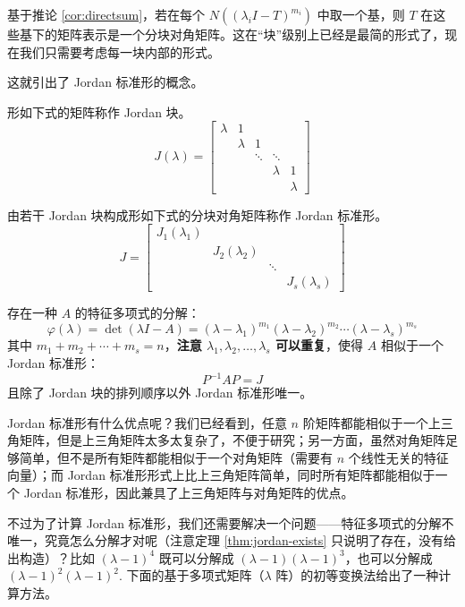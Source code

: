 基于推论 \ref{cor:directsum}，若在每个 $N((\lambda_i I-T)^{m_i})$ 中取一个基，则 $T$ 在这些基下的矩阵表示是一个分块对角矩阵。这在“块”级别上已经是最简的形式了，现在我们只需要考虑每一块内部的形式。


这就引出了 Jordan 标准形的概念。

\begin{definition}[Jordan 块]
形如下式的矩阵称作 Jordan 块。
\[
    J(\lambda)=\begin{bmatrix}
    \lambda&1&&&\\
    &\lambda&1&&\\
    &&\ddots&\ddots&\\
    &&&\lambda&1\\
    &&&&\lambda
    \end{bmatrix}
\]
\end{definition}

\begin{definition}
由若干 Jordan 块构成形如下式的分块对角矩阵称作 Jordan 标准形。
\[
    J=\begin{bmatrix}
    J_1(\lambda_1)&&&\\&J_2(\lambda_2)&&\\&&\ddots&\\&&&J_s(\lambda_s)
    \end{bmatrix}
\]
\end{definition}

\begin{theorem}
\label{thm:jordan-exists}
存在一种 $A$ 的特征多项式的分解：
\[
    \varphi(\lambda)=\det(\lambda I-A)=(\lambda-\lambda_1)^{m_1}(\lambda-\lambda_2)^{m_2}\cdots(\lambda-\lambda_s)^{m_s}
\]
其中 $m_1+m_2+\cdots+m_s=n$，\textbf{注意 $\lambda_1,\lambda_2,\ldots,\lambda_s$ 可以重复}，使得 $A$ 相似于一个 Jordan 标准形：
\[P^{-1}AP=J\]
且除了 Jordan 块的排列顺序以外 Jordan 标准形唯一。
\end{theorem}

Jordan 标准形有什么优点呢？我们已经看到，任意 $n$ 阶矩阵都能相似于一个上三角矩阵，但是上三角矩阵太多太复杂了，不便于研究；另一方面，虽然对角矩阵足够简单，但不是所有矩阵都能相似于一个对角矩阵（需要有 $n$ 个线性无关的特征向量）；而 Jordan 标准形形式上比上三角矩阵简单，同时所有矩阵都能相似于一个 Jordan 标准形，因此兼具了上三角矩阵与对角矩阵的优点。

不过为了计算 Jordan 标准形，我们还需要解决一个问题——特征多项式的分解不唯一，究竟怎么分解才对呢（注意定理 \ref{thm:jordan-exists} 只说明了存在，没有给出构造）？比如 $(\lambda-1)^4$ 既可以分解成 $(\lambda-1)(\lambda-1)^3$，也可以分解成 $(\lambda -1)^2(\lambda -1)^2$. 下面的基于多项式矩阵（$\lambda$ 阵）的初等变换法给出了一种计算方法。

